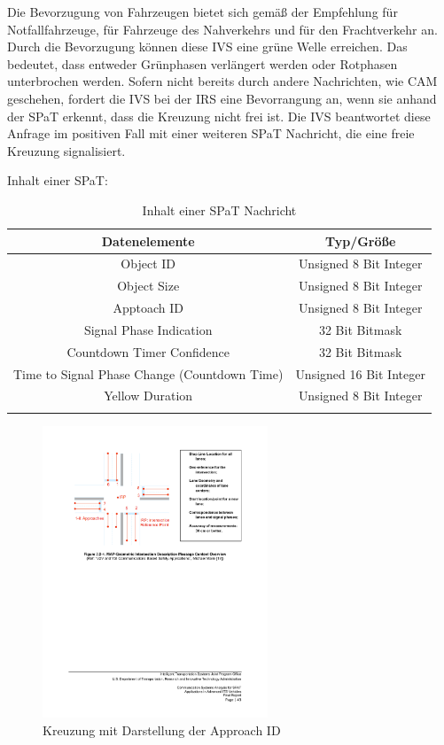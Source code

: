 Die Bevorzugung von Fahrzeugen bietet sich gemäß der Empfehlung \cite{usSpat} für Notfallfahrzeuge, für Fahrzeuge des Nahverkehrs und für den Frachtverkehr an. Durch die Bevorzugung können diese \ac{IVS} eine grüne Welle erreichen. Das bedeutet, dass entweder Grünphasen verlängert werden oder Rotphasen unterbrochen werden. Sofern nicht bereits durch andere Nachrichten, wie \ac{CAM} geschehen, fordert die \ac{IVS} bei der \ac{IRS} eine Bevorrangung an, wenn sie anhand der \ac{SPaT} erkennt, dass die Kreuzung nicht frei ist. Die \ac{IVS} beantwortet diese Anfrage im positiven Fall mit einer weiteren \ac{SPaT} Nachricht, die eine freie Kreuzung signalisiert.   

Inhalt einer \ac{SPaT}:
\begin{longtable}{|c|c|}
 \hline
\textbf{Datenelemente} & \textbf{Typ/Größe}\\
 \hline
 \hline
Object ID & Unsigned 8 Bit Integer\\
 \hline
 Object Size& Unsigned 8 Bit Integer\\
 \hline
 Apptoach ID & Unsigned 8 Bit Integer\\
 \hline
 Signal Phase Indication &  32 Bit Bitmask \\
 \hline
 Countdown Timer Confidence & 32 Bit Bitmask \\
 \hline
 Time to Signal Phase Change (Countdown Time) & Unsigned 16 Bit Integer \\
 \hline
 Yellow Duration & Unsigned 8 Bit Integer\\
 \hline
 \caption{Inhalt einer SPaT Nachricht \cite{usSpat}}
 \label{tab:facilitylayer_inhaltSpatNachricht}
 \end{longtable}


\begin{figure}[htbp]
	\includegraphics[width=0.60\textwidth]{content/images/04_facilitylayer/spatKreuzung-Anfahrtsstreifen.pdf}
	\caption{Kreuzung mit Darstellung der Approach ID \cite{usSpat}}
	\label{fig:darstellungKreuzung}
\end{figure}